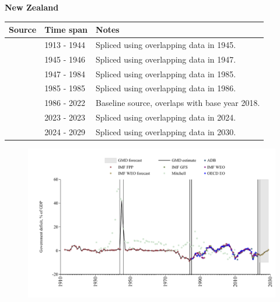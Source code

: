 \documentclass[12pt,a4paper,landscape]{article}
\begin{document}
\begin{adjustbox}{max totalsize={\paperwidth}{\paperheight},center}
\begin{minipage}[t][\textheight][t]{\textwidth}
\vspace*{0.5cm}
{}
\begin{center}
{\Large\bfseries New Zealand}
\end{center}
\vspace{0.5cm}
\begin{table}[H]
\centering
\small
\begin{tabular}{|l|l|l|}
\hline
\textbf{Source} & \textbf{Time span} & \textbf{Notes} \\
\hline
\rowcolor{white}\cite{IMF_FPP}& 1913 - 1944 &Spliced using overlapping data in 1945.\\
\rowcolor{lightgray}\cite{Mitchell}& 1945 - 1946 &Spliced using overlapping data in 1947.\\
\rowcolor{white}\cite{IMF_FPP}& 1947 - 1984 &Spliced using overlapping data in 1985.\\
\rowcolor{lightgray}\cite{IMF_WEO}& 1985 - 1985 &Spliced using overlapping data in 1986.\\
\rowcolor{white}\cite{OECD_EO}& 1986 - 2022 &Baseline source, overlaps with base year 2018.\\
\rowcolor{lightgray}\cite{IMF_FPP}& 2023 - 2023 &Spliced using overlapping data in 2024.\\
\rowcolor{white}\cite{IMF_WEO_forecast}& 2024 - 2029 &Spliced using overlapping data in 2030.\\
\hline
\end{tabular}
\end{table}
\begin{figure}[H]
\centering
\includegraphics[width=\textwidth,height=0.6\textheight,keepaspectratio]{graphs/NZL_govdef_GDP.pdf}
\end{figure}
\end{minipage}
\end{adjustbox}
\end{document}
